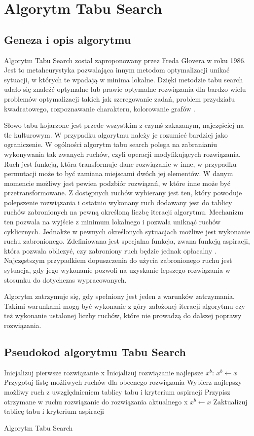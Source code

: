 \section{Algorytm Tabu Search}
\label{sec:TS}
\subsection{Geneza i opis algorytmu}
Algorytm Tabu Search został zaproponowany przez Freda Glovera w roku 1986. Jest to metaheurystyka pozwalająca innym metodom optymalizacji unikać sytuacji, w których te wpadają w minima lokalne. Dzięki metodzie tabu search udało się znaleźć optymalne lub prawie optymalne rozwiązania dla bardzo wielu problemów optymalizacji takich jak szeregowanie zadań, problem przydziału kwadratowego, rozpoznawanie charakteru, kolorowanie grafów \cite{TABU}.

Słowo tabu kojarzone jest przede wszystkim z czymś zakazanym, najczęściej na tle kulturowym. W przypadku algorytmu należy je rozumieć bardziej jako ograniczenie. W ogólności algorytm tabu search polega na zabranianiu wykonywania tak zwanych ruchów, czyli operacji modyfikujących rozwiązania. Ruch jest funkcją, która transformuje dane rozwiązanie w inne, w przypadku permutacji może to być zamiana miejscami dwóch jej elementów. W danym momencie możliwy jest pewien podzbiór rozwiązań, w które inne może być przetransformowane. Z dostępnych ruchów wybierany jest ten, który powoduje polepszenie rozwiązania i ostatnio wykonany ruch dodawany jest do tablicy ruchów zabronionych na pewną określoną liczbę iteracji algorytmu. Mechanizm ten pozwala na wyjście z minimum lokalnego i pozwala uniknąć ruchów cyklicznych. Jednakże w pewnych określonych sytuacjach możliwe jest wykonanie ruchu zabronionego. Zdefiniowana jest specjalna funkcja, zwana funkcją aspiracji, która pozwala obliczyć, czy zabroniony ruch będzie jednak opłacalny \cite{META_HEU}. Najczęstszym przypadkiem dopuszczenia do użycia zabronionego ruchu jest sytuacja, gdy jego wykonanie pozwoli na uzyskanie lepszego rozwiązania w stosunku do dotychczas wypracowanych.

Algorytm zatrzymuje się, gdy spełniony jest jeden z warunków zatrzymania. Takimi warunkami mogą być wykonanie z góry założonej iteracji algorytmu czy też wykonanie ustalonej liczby ruchów, które nie prowadzą do dalszej poprawy rozwiązania.

\subsection{Pseudokod algorytmu Tabu Search}
\begin{algorithm}[H]
	Inicjalizuj pierwsze rozwiązanie x\;
	Inicjalizuj rozwiązanie najlepsze $x^b$: $x^b \leftarrow x$\;
 	{
 		Przygotuj listę możliwych ruchów dla obecnego rozwiązania\;
 		Wybierz najlepszy możliwy ruch z uwzględnieniem tablicy tabu i kryterium aspiracji\;
 		Przypisz otrzymane w ruchu rozwiązanie do rozwiązania aktualnego x\;
 		{
 			$x^b \leftarrow x$
 		} 		
 		Zaktualizuj tablicę tabu i kryterium aspiracji\;		
 	}
 	\caption{Algorytm Tabu Search}
\end{algorithm}

